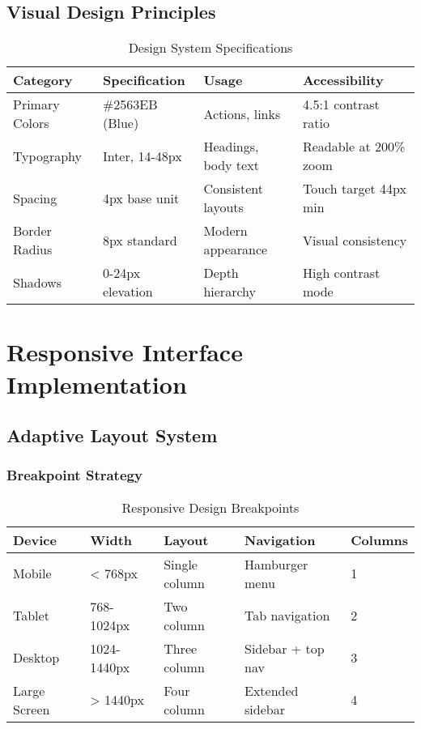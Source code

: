 \subsection{Visual Design Principles}

\begin{table}[H]
\centering
\caption{Design System Specifications}
\begin{tabular}{|p{3cm}|p{3cm}|p{3cm}|p{3cm}|}
\hline
\textbf{Category} & \textbf{Specification} & \textbf{Usage} & \textbf{Accessibility} \\
\hline
Primary Colors & \#2563EB (Blue) & Actions, links & 4.5:1 contrast ratio \\
\hline
Typography & Inter, 14-48px & Headings, body text & Readable at 200\% zoom \\
\hline
Spacing & 4px base unit & Consistent layouts & Touch target 44px min \\
\hline
Border Radius & 8px standard & Modern appearance & Visual consistency \\
\hline
Shadows & 0-24px elevation & Depth hierarchy & High contrast mode \\
\hline
\end{tabular}
\end{table}

\section{Responsive Interface Implementation}

\subsection{Adaptive Layout System}

\subsubsection{Breakpoint Strategy}

\begin{table}[H]
\centering
\caption{Responsive Design Breakpoints}
\begin{tabular}{|p{2cm}|p{2cm}|p{3cm}|p{3cm}|p{2cm}|}
\hline
\textbf{Device} & \textbf{Width} & \textbf{Layout} & \textbf{Navigation} & \textbf{Columns} \\
\hline
Mobile & < 768px & Single column & Hamburger menu & 1 \\
\hline
Tablet & 768-1024px & Two column & Tab navigation & 2 \\
\hline
Desktop & 1024-1440px & Three column & Sidebar + top nav & 3 \\
\hline
Large Screen & > 1440px & Four column & Extended sidebar & 4 \\
\hline
\end{tabular}
\end{table}

